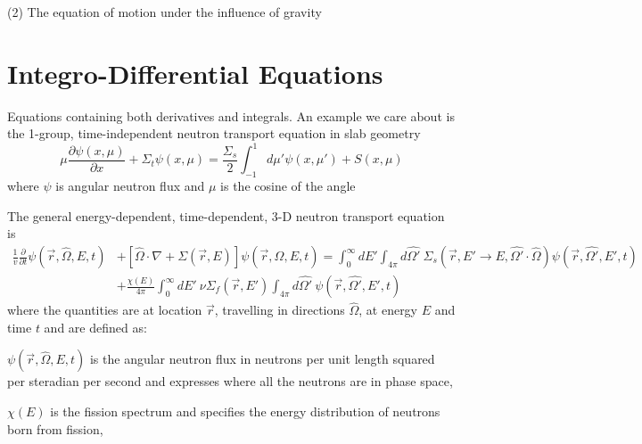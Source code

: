 \documentclass[12pt]{article}
\newcommand{\Macro}{\ensuremath{\Sigma}}
\begin{document}
\vspace*{2em}
(2) The equation of motion under the influence of gravity 


\section{Integro-Differential Equations}

Equations containing both derivatives and integrals. An example we care about is the 1-group, time-independent neutron transport equation in slab geometry
%
\begin{equation}
\mu \frac{\partial \psi(x,\mu)}{\partial x} + \Macro_t \psi(x,\mu) = \frac{\Macro_s}{2} \int_{-1}^1 d\mu' \psi(x, \mu') + S(x, \mu) \nonumber
\end{equation}
%
where $\psi$ is angular neutron flux and $\mu$ is the cosine of the angle

The general energy-dependent, time-dependent, 3-D neutron transport equation is 
\begin{align}
\frac{1}{v} \frac{\partial}{\partial t}\psi(\vec{r}, \hat{\Omega}, E, t) &+ [\hat{\Omega} \cdot \nabla + \Macro(\vec{r}, E)] \psi(\vec{r}, \hat{\Omega}, E, t)  =  \int_0^{\infty} dE' \int_{4\pi} d\hat{\Omega'} \:\Macro_{s}(\vec{r}, E' \to E, \hat{\Omega'} \cdot \hat{\Omega}) \psi(\vec{r}, \hat{\Omega'}, E', t) \nonumber \\
&+\frac{ \chi(E)}{4 \pi} \int_0^{\infty} dE' \:\nu \Macro_{f}(\vec{r}, E') \int_{4\pi} d\hat{\Omega'} \:\psi(\vec{r}, \hat{\Omega'}, E', t) \nonumber
\end{align}
%
\noindent where the quantities are at location $\vec{r}$, travelling in directions $\hat{\Omega}$, at energy $E$ and time $t$ and are defined as:
\begin{list}{}{\hspace{2em}}
  \item $\psi(\vec{r}, \hat{\Omega}, E, t)$ is the angular neutron flux in neutrons per unit length squared per steradian per second and expresses where all the neutrons are in phase space, 
  \item $\chi(E)$ is the fission spectrum and specifies the energy distribution of neutrons born from fission,
\end{list}

\end{document}
